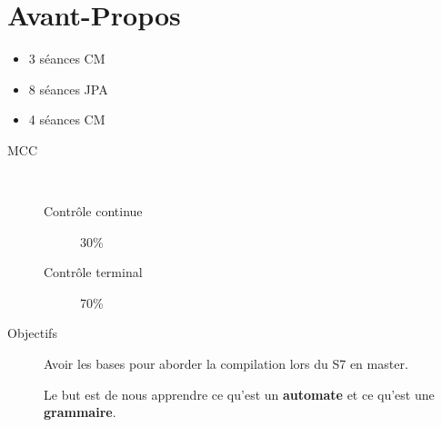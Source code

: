 \documentclass[12pt,a4paper,openany]{book}
\begin{document}
	\thispagestyle{empty} %
	\titleBC 
	\dominitoc
	\setcounter{tocdepth}{1}
	\setcounter{secnumdepth}{3}
	\setcounter{minitocdepth}{1}
	\chapter*{Avant-Propos}
	\begin{itemize}
		\item 3 séances CM
		\item 8 séances JPA
		\item 4 séances CM
	\end{itemize}
	\begin{description}
		\item[MCC]~
	\begin{description}
		\item[Contrôle continue] 30\%
		\item[Contrôle terminal] 70\%
	\end{description}
\item[Objectifs] 
	Avoir les bases pour aborder la compilation lors du S7 en master.

	Le but est de nous apprendre ce qu'est un \textbf{automate} et ce qu'est une \textbf{grammaire}.
	\end{description}
	\tableofcontents
	
	
	
\end{document}
